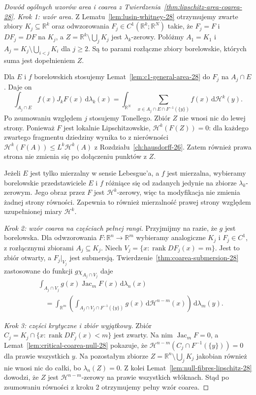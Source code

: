 \documentclass[11pt,a4paper,oneside]{book}
\numberwithin{equation}{chapter}
\theoremstyle{plain}
\theoremstyle{definition}
\theoremstyle{remark}
\begin{document}
\begin{proof}[Dowód ogólnych wzorów area i coarea z
Twierdzenia~\ref{thm:lipschitz-area-coarea-28}]
\emph{Krok 1: wzór area.}
Z Lematu~\ref{lem:lusin-whitney-28} otrzymujemy
zwarte zbiory $K_j\subseteq\mathbb R^k$ oraz
odwzorowania $F_j\in C^1(\mathbb R^k;\mathbb R^N)$
takie, że $F_j=F$ i $DF_j=DF$ na $K_j$, a
$Z=\mathbb R^k\setminus\bigcup_jK_j$ jest
$\lambda_k$-zerowy. Połóżmy
$A_1=K_1$ i
$A_j=K_j\setminus\bigcup_{i<j}K_i$ dla $j\ge2$.
Są to parami rozłączne zbiory borelowskie,
których suma jest dopełnieniem $Z$.

Dla $E$ i $f$ borelowskich stosujemy
Lemat~\ref{lem:c1-general-area-28} do
$F_j$ na $A_j\cap E$. Daje on
\[
 \int_{A_j\cap E}f(x)J_kF(x)\,\mathrm d\lambda_k(x)
 =\int_{\mathbb R^N}
 \sum_{x\in A_j\cap E\cap F^{-1}(\{y\})}f(x)
 \,\mathrm d\mathcal H^k(y).
\]
Po zsumowaniu względem $j$ stosujemy Tonellego.
Zbiór $Z$ nie wnosi nic do lewej strony.
Ponieważ $F$ jest lokalnie Lipschitzowskie,
$\mathcal H^k(F(Z))=0$: dla każdego zwartego
fragmentu dziedziny wynika to z nierówności
$\mathcal H^k(F(A))\le L^k\mathcal H^k(A)$
z Rozdziału~\ref{ch:hausdorff-26}.
Zatem również prawa strona nie zmienia się
po dołączeniu punktów z $Z$.

Jeżeli $E$ jest tylko mierzalny w sensie
Lebesgue'a, a $f$ jest mierzalna, wybieramy
borelowskie przedstawiciele $E$ i $f$ różniące
się od zadanych jedynie na zbiorze
$\lambda_k$-zerowym. Jego obraz przez $F$
jest $\mathcal H^k$-zerowy, więc ta modyfikacja
nie zmienia żadnej strony równości. Zapewnia
to również mierzalność prawej strony względem
uzupełnionej miary $\mathcal H^k$.

\emph{Krok 2: wzór coarea na częściach pełnej rangi.}
Przyjmijmy na razie, że $g$ jest borelowska.
Dla odwzorowania $F:\mathbb R^n\to\mathbb R^m$
wybieramy analogiczne $K_j$ i $F_j\in C^1$,
z rozłącznymi zbiorami $A_j\subseteq K_j$.
Niech
$V_j=\{x:\operatorname{rank}DF_j(x)=m\}$.
Jest to zbiór otwarty, a $F_j|_{V_j}$ jest
submersją. Twierdzenie~\ref{thm:coarea-submersion-28}
zastosowane do funkcji
$g\chi_{A_j\cap V_j}$ daje
\begin{align*}
 &\int_{A_j\cap V_j}g(x)\operatorname{Jac}_mF(x)
 \,\mathrm d\lambda_n(x)\\
 &\quad=\int_{\mathbb R^m}\left(
 \int_{A_j\cap V_j\cap F^{-1}(\{y\})}
 g(x)\,\mathrm d\mathcal H^{n-m}(x)\right)
 \,\mathrm d\lambda_m(y).
\end{align*}

\emph{Krok 3: części krytyczne i zbiór wyjątkowy.}
Zbiór
$C_j=K_j\cap\{x:\operatorname{rank}DF_j(x)<m\}$
jest zwarty. Na nim $\operatorname{Jac}_mF=0$,
a Lemat~\ref{lem:critical-coarea-null-28}
pokazuje, że
$\mathcal H^{n-m}(C_j\cap F^{-1}(\{y\}))=0$
dla prawie wszystkich $y$. Na pozostałym zbiorze
$Z=\mathbb R^n\setminus\bigcup_jK_j$ jakobian
również nie wnosi nic do całki, bo
$\lambda_n(Z)=0$. Z kolei
Lemat~\ref{lem:null-fibres-lipschitz-28} dowodzi,
że $Z$ jest $\mathcal H^{n-m}$-zerowy na
prawie wszystkich włóknach. Stąd po zsumowaniu
równości z kroku 2 otrzymujemy pełny wzór coarea.


\end{proof}
\end{document}
